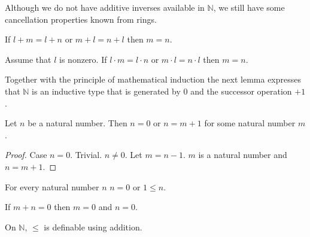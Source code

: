 \documentclass{article}
\begin{document}
Although we do not have additive inverses available in 
$\mathbb{N}$, we still have some cancellation properties
known from rings.
\begin{forthel}
\begin{lemma}
If $l + m = l + n$ or $m + l = n + l$ then $m = n$.
\end{lemma}

\begin{lemma}
Assume that $l$ is nonzero.
If $l \cdot m = l \cdot n$ or $m \cdot l = n \cdot l$ then $m = n$.
\end{lemma}
\end{forthel}
%
Together with the principle of mathematical induction the next
lemma expresses that $\mathbb{N}$ is an inductive type that
is generated by $0$ and the successor operation $+1$. 
%
\begin{forthel}
\begin{lemma} Let $n$ be a natural number. Then
$n = 0$ or $n = m + 1$ for some natural number $m$.
\end{lemma}
\begin{proof}
Case $n = 0$. Trivial.
$n \neq 0$. Let $m = n - 1$. $m$ is a natural number and
$n = m + 1$.
\end{proof}

\begin{lemma}
For every natural number $n$ $n = 0$ or $1 \leq n$.
\end{lemma}

\begin{lemma}
If $m + n = 0$ then $m = 0$ and $n = 0$.
\end{lemma}
\end{forthel}
%
On $\mathbb{N}$, $\leq$ is definable using addition.
%
\end{document}
